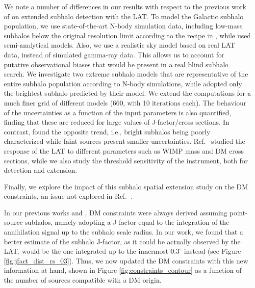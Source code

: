 \documentclass[%
 reprint,
nofootinbib,
 amsmath,amssymb,
 aps,
]{revtex4-2}
\begin{document}
{  We note a number of differences in our results with respect to the previous work of \cite{Mauro2020} on extended subhalo detection with the LAT. To model the Galactic subhalo population, we use state-of-the-art N-body simulation data, including low-mass subhalos below the original resolution limit according to the recipe in , while \cite{Mauro2020} used semi-analytical models. Also, we use a realistic sky model based on real LAT data, instead of simulated gamma-ray data. This allows us to account for putative observational biases that would be present in a real blind subhalo search. 
We investigate two extreme subhalo models that are representative of the entire subhalo population according to N-body simulations, %
while \cite{Mauro2020} adopted only the brightest subhalo predicted by their model. We extend the computations for a much finer grid of different models (660, with 10 iterations each). The behaviour of the uncertainties as a function of the input parameters is also quantified, finding that these are reduced for large values of J-factor/cross sections. In contrast, \cite{Mauro2020} found the opposite trend, i.e., bright subhalos being poorly characterized while faint sources present smaller uncertainties. Ref.~\cite{Mauro2020} studied the response of the LAT to different parameters such as WIMP mass and DM cross sections, while we also study the threshold sensitivity of the instrument, both for detection and extension.
    


Finally, we explore the impact of this subhalo spatial extension study on the DM constraints, an issue not explored in Ref.~\cite{Mauro2020}.} In our previous works  and \cite{CoronadoBlazquez2020}, DM constraints were always derived assuming point-source subhalos, namely adopting a J-factor equal to the integration of the annihilation signal up to the subhalo scale radius. In our work, we found that a better estimate of the subhalo J-factor, as it could be actually observed by the LAT, would be the one integrated up to the innermost $0.3^\circ$ instead (see Figure \ref{fig:jfact_dist_rs_03}). Thus, we now updated the DM constraints with this new information at hand, shown in Figure \ref{fig:constraints_contour} as a function of the number of sources compatible with a DM origin.
\end{document}
